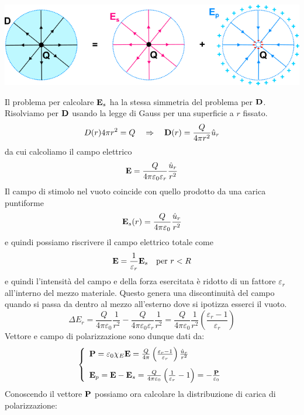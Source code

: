 \begin{center}
	\includegraphics[width = 15cm]{images/spheredecomp}
\end{center}
Il problema per calcolare $\bold{E}_s$ ha la stessa simmetria del problema per $\bold{D}$. Risolviamo per $\bold{D}$ usando la legge di Gauss per una superficie a $r$ fissato.
\begin{equation*}
	D(r) 4 \pi r^2 = Q \quad \Rightarrow  \quad \bold{D}(r) = \frac{Q}{4 \pi r^2} \hat{u}_{r}
\end{equation*}
da cui calcoliamo il campo elettrico
\begin{equation*}
	\bold{E} = \frac{Q}{4 \pi \varepsilon_0 \varepsilon_{r}} \frac{\hat{u}_r}{r^2}
\end{equation*}
Il campo di stimolo nel vuoto coincide con quello prodotto da una carica puntiforme 
\begin{equation*}
	\bold{E}_{s}(r) = \frac{Q}{4 \pi \varepsilon_0} \frac{\hat{u}_{r}}{r^2}
\end{equation*}
e quindi possiamo riscrivere il campo elettrico totale come 
\begin{equation*}
	\bold{E} = \frac{1}{\varepsilon_{r}} \bold{E}_{s} \quad \text{per } r < R
\end{equation*}
e quindi l'intensit\`a del campo e della forza esercitata \`e ridotto di un fattore $\varepsilon_{r}$ all'interno del mezzo materiale. Questo genera una discontinuit\`a del campo quando si passa da dentro al mezzo all'esterno dove si ipotizza esserci il vuoto.
\begin{equation*}
	\Delta E_{r} = \frac{Q}{4 \pi \varepsilon_0} \frac{1}{r^2} - \frac{Q}{4 \pi \varepsilon_0\varepsilon_{r}} \frac{1}{r^2} = \frac{Q}{4 \pi \varepsilon_0} \frac{1}{r^2} \left(\frac{\varepsilon_r -1}{\varepsilon_r}\right)
\end{equation*}
Vettore e campo di polarizzazione sono dunque dati da:
\begin{equation*}
	\left \{ \begin{array}{l}
		\bold{P} = \varepsilon_0 \chi_{E} \bold{E} = \frac{Q}{4 \pi} \left(\frac{\varepsilon_r -1 }{\varepsilon_r}\right)\frac{\hat{u}_{r}}{r^2} \\ \rule{0pt}{20pt}
		\bold{E}_{p} = \bold{E} - \bold{E}_{s} = \frac{Q }{4 \pi \varepsilon_0}\left(\frac{1}{\varepsilon_r} -1\right) = - \frac{\bold{P}}{\varepsilon_{0}}
	\end{array}\right.
\end{equation*}
Conoscendo il vettore $\bold{P}$ possiamo ora calcolare la distribuzione di carica di polarizzazione:

